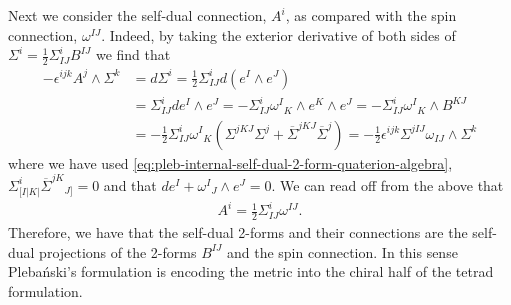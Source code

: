 \documentclass[10pt]{report}
\newcommand{\pleb}[0]{Pleba\'nski}
\theoremstyle{definition}
\newcommand{\asd}[0]{\overline{\Sigma}}
\begin{document}
Next we consider the self-dual connection, $A^i$, as compared with the spin connection, $\omega^{IJ}$. Indeed, by taking the exterior derivative of both sides of $\Sigma^i = \frac{1}{2} \Sigma^i_{IJ}B^{IJ}$ we find that
\begin{align}
    -\epsilon^{ijk} A^j \wedge \Sigma^k & = d\Sigma^i = \frac{1}{2} \Sigma^i_{IJ} d(e^I \wedge e^J) \nonumber \\ & = \Sigma^i_{IJ} de^I \wedge e^J = - \Sigma^i_{IJ} \omega^I{}_K \wedge e^K \wedge e^J = - \Sigma^i_{IJ} \omega^I{}_K \wedge  B^{KJ} \nonumber \\ & = - \frac{1}{2}\Sigma^i_{IJ} \omega^I{}_K \left( \Sigma^{jKJ} \Sigma^j + \asd^{jKJ} \asd^j \right) = - \frac{1}{2} \epsilon^{ijk} \Sigma^{jIJ}\omega_{IJ} \wedge \Sigma^k 
\end{align}
where we have used \cref{eq:pleb-internal-self-dual-2-form-quaterion-algebra}, $\Sigma^i_{[I|K|} \asd^{jK}{}_{J]} = 0$ and that $de^I + \omega^I{}_J \wedge e^J = 0$. We can read off from the above that 
\begin{align}
    A^i = \frac{1}{2} \Sigma^i_{IJ} \omega^{IJ}.
\end{align}
Therefore, we have that the self-dual 2-forms and their connections are the self-dual projections of the 2-forms $B^{IJ}$ and the spin connection. In this sense \pleb{}'s formulation is encoding the metric into the chiral half of the tetrad formulation.
\end{document}
